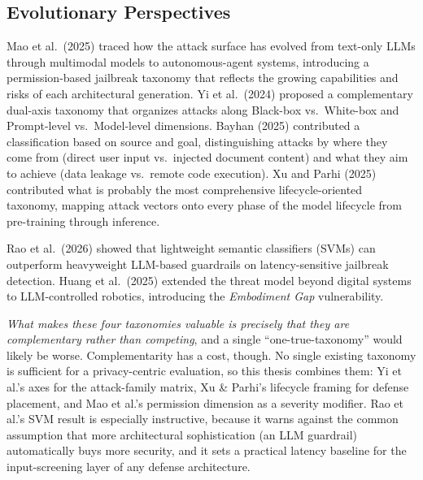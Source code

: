 \documentclass[12pt, a4paper]{report}
\begin{document}
\subsection{Evolutionary Perspectives}

Mao et al.\ (2025) traced how the attack surface has evolved from text-only LLMs through multimodal models to autonomous-agent systems, introducing a permission-based jailbreak taxonomy that reflects the growing capabilities and risks of each architectural generation. Yi et al.\ (2024) proposed a complementary dual-axis taxonomy that organizes attacks along Black-box vs.\ White-box and Prompt-level vs.\ Model-level dimensions. Bayhan (2025) contributed a classification based on source and goal, distinguishing attacks by where they come from (direct user input vs.\ injected document content) and what they aim to achieve (data leakage vs.\ remote code execution). Xu and Parhi (2025) contributed what is probably the most comprehensive lifecycle-oriented taxonomy, mapping attack vectors onto every phase of the model lifecycle from pre-training through inference.

Rao et al.\ (2026) showed that lightweight semantic classifiers (SVMs) can outperform heavyweight LLM-based guardrails on latency-sensitive jailbreak detection. Huang et al.\ (2025) extended the threat model beyond digital systems to LLM-controlled robotics, introducing the \emph{Embodiment Gap} vulnerability.

\begin{critbox}
\textit{What makes these four taxonomies valuable is precisely that they are complementary rather than competing}, and a single ``one-true-taxonomy'' would likely be worse. Complementarity has a cost, though. No single existing taxonomy is sufficient for a privacy-centric evaluation, so this thesis combines them: Yi et al.'s axes for the attack-family matrix, Xu \& Parhi's lifecycle framing for defense placement, and Mao et al.'s permission dimension as a severity modifier. Rao et al.'s SVM result is especially instructive, because it warns against the common assumption that more architectural sophistication (an LLM guardrail) automatically buys more security, and it sets a practical latency baseline for the input-screening layer of any defense architecture.
\end{critbox}
\end{document}
